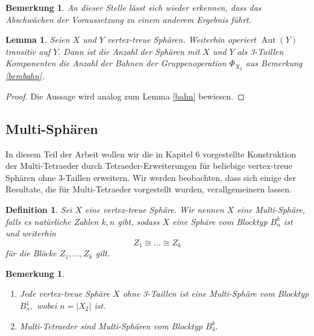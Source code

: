 \documentclass[12pt,titlepage,twoside,cleardoublepage]{article}
\theoremstyle{nummermitklammern}
\newtheorem{lemma}[temp]{Lemma}
\newtheorem{definition}[temp]{Definition}
\newtheorem{bemerkung}[temp]{Bemerkung}
\newtheorem{definition}[zahl]{Definition}
\newtheorem{lemma}[zahl]{Lemma}
\newtheorem{bemerkung}[zahl]{Bemerkung}
\numberwithin{equation}{section}
\DeclareMathOperator{\Aut}{Aut}
\begin{document}
\begin{bemerkung}
An dieser Stelle lässt sich wieder erkennen, dass das Abschwächen
der Voraussetzung zu einem anderem Ergebnis führt.
\end{bemerkung}


\begin{lemma}
Seien $X$ und $Y$ vertex-treue Sphären. Weiterhin operiert $\Aut(Y)$ transitiv auf $Y.$ Dann ist die Anzahl der Sphären mit $X$ und $Y$ als 3-Taillen Komponenten die Anzahl der Bahnen der Gruppenoperation $\Phi_{X_2}$ aus Bemerkung \ref{bembahn}.
\end{lemma}
\begin{proof}
Die Aussage wird analog zum Lemma \ref{bahn} bewiesen.
\end{proof}
\subsection{Multi-Sphären}
In diesem Teil der Arbeit wollen wir die in Kapitel 6 vorgestellte Konstruktion der Multi-Tetraeder durch Tetraeder-Erweiterungen für beliebige vertex-treue Sphären ohne 3-Taillen erweitern. Wir werden beobachten, dass sich einige der Resultate, die für Multi-Tetraeder vorgestellt wurden, verallgemeinern lassen.
\begin{definition}
Sei $X$ eine vertex-treue Sphäre. Wir nennen $X$ eine \emph{Multi-Sphäre}, falls es natürliche Zahlen $k,n$ gibt, sodass $X$ eine Sphäre vom Blocktyp $B_n^k$ ist und weiterhin
\[
 Z_1\cong \ldots\cong Z_k
\]
für die Blöcke $Z_1,\ldots,Z_k$ gilt. 
\end{definition}
\begin{bemerkung}
\begin{enumerate}
\item Jede vertex-treue Sphäre $X$ ohne 3-Taillen ist eine Multi-Sphäre vom Blocktyp $B_n^1,$ wobei $n=\vert X_2\vert$ ist.
\item Multi-Tetraeder sind Multi-Sphären vom Blocktyp $B_4^k.$
\end{enumerate}
\end{bemerkung}
\end{document}
